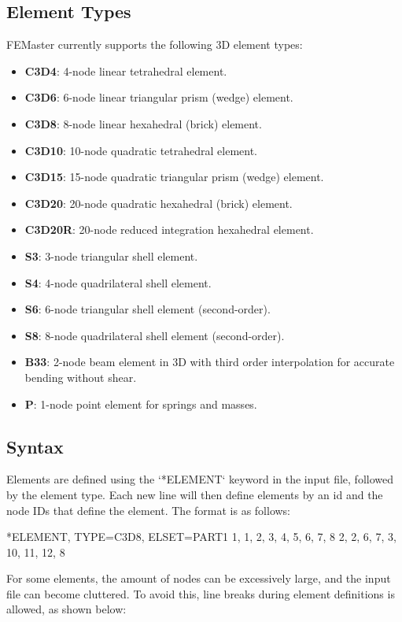 \subsection{Element Types}

FEMaster currently supports the following 3D element types:
\begin{itemize}
    \item \textbf{C3D4}: 4-node linear tetrahedral element.
    \item \textbf{C3D6}: 6-node linear triangular prism (wedge) element.
    \item \textbf{C3D8}: 8-node linear hexahedral (brick) element.
    \item \textbf{C3D10}: 10-node quadratic tetrahedral element.
    \item \textbf{C3D15}: 15-node quadratic triangular prism (wedge) element.
    \item \textbf{C3D20}: 20-node quadratic hexahedral (brick) element.
    \item \textbf{C3D20R}: 20-node reduced integration hexahedral element.
    \item \textbf{S3}: 3-node triangular shell element.
    \item \textbf{S4}: 4-node quadrilateral shell element.
    \item \textbf{S6}: 6-node triangular shell element (second-order).
    \item \textbf{S8}: 8-node quadrilateral shell element (second-order).
    \item \textbf{B33}: 2-node beam element in 3D with third order interpolation for accurate bending without shear.
    \item \textbf{P}: 1-node point element for springs and masses.
\end{itemize}

\subsection{Syntax}
Elements are defined using the `*ELEMENT` keyword in the input file,
followed by the element type. Each new line will then define elements by an id and the node IDs that define the element.
 The format is as follows:

\begin{codeBlock}
*ELEMENT, TYPE=C3D8, ELSET=PART1
1, 1, 2, 3, 4, 5, 6, 7, 8
2, 2, 6, 7, 3, 10, 11, 12, 8
\end{codeBlock}

For some elements, the amount of nodes can be excessively large, and the input file can become cluttered.
To avoid this, line breaks during element definitions is allowed, as shown below:

